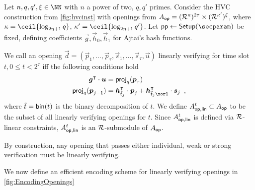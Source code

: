 \begin{definition}\label{def:linearlygoodopenings}
Let $n,q,q',\xi\in\NN$ with $n$ a power of two, $q,q'$ primes.
Consider the HVC construction from \autoref{fig:hvcinst} with openings from
$A_{\mathsf{op}} = (\mathcal{R}^\kappa)^{2\tau} \times (\mathcal{R}^{\kappa'})^\xi$, where $\limbs = \ceil{\log_{2\eta+1}q}$, $\limbs' = \ceil{\log_{2\eta+1}q'}$.
Let $\params\gets\setup(\secparam)$ be fixed, defining coefficients $\vec{g},\vec{h}_0,\vec{h}_1$ for Ajtai's hash functions.

We call an opening $\vec{d} = (\vec{p}_1,\ldots,\vec{p}_\tau, \vec{s}_1,\ldots,\vec{s}_\tau,\vec{u})$ linearly verifying for time slot $t, 0\leq t<2^\tau$ iff the following conditions hold
\begin{align*}
\vec{g}^\transpose \cdot \vec{u} & =  \projmod{q}(\vec{p}_\tau)\\
\projmod{q}(\vec{p}_{j-1}) & = \vec{h}_{\tilde t_j}^\transpose\cdot \vec{p}_{j} + \vec{h}_{\tilde t_j \xor 1}^\transpose \cdot \vec{s}_{j}\enspace,
\end{align*}
where $\tilde{t} = \mathsf{bin}(t)$ is the binary decomposition of $t$. We define $A_{\mathsf{op,lin}}^{t}\subset A_{\mathsf{op}}$ to be the subset of all linearly verifying openings for $t$.
Since $A_{\mathsf{op,lin}}^{t}$ is defined via $\mathcal{R}$-linear constraints, $A_{\mathsf{op,lin}}^{t}$ is an $\mathcal{R}$-submodule of $A_{\mathsf{op}}$.
\end{definition}
By construction, any opening that passes either individual, weak or strong verification must be linearly verifying.

We now define an efficient encoding scheme for linearly verifying openings in \autoref{fig:EncodingOpenings}

